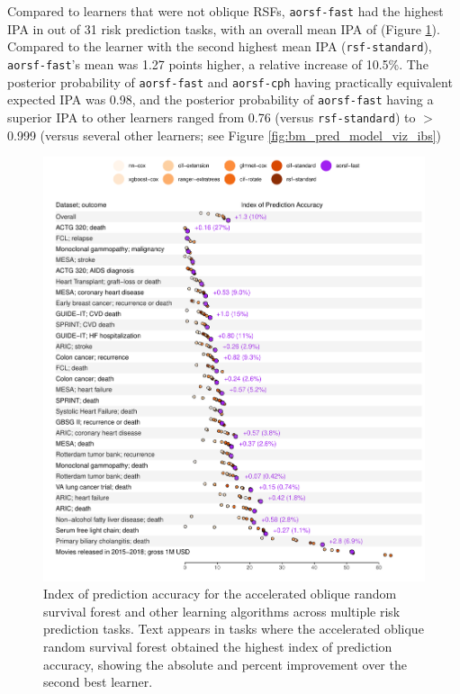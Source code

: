 \documentclass[twoside,11pt]{article}\usepackage[]{graphicx}\usepackage[]{xcolor}
\makeatletter
\def\maxwidth{ %
  \ifdim\Gin@nat@width>\linewidth
    \linewidth
  \else
    \Gin@nat@width
  \fi
}
\newenvironment{knitrout}{}{} %
\makeatother
\begin{document}
Compared to learners that were not oblique RSFs, \texttt{aorsf-fast} had the highest IPA in  out of 31 risk prediction tasks, with an overall mean IPA of  (Figure \ref{fig:bm_pred_viz_ibs}). Compared to the learner with the second highest mean IPA (\texttt{rsf-standard}), \texttt{aorsf-fast}'s mean was 1.27 points higher, a relative increase of 10.5\%. The posterior probability of \texttt{aorsf-fast} and \texttt{aorsf-cph} having practically equivalent expected IPA was 0.98, and the posterior probability of \texttt{aorsf-fast} having a superior IPA to other learners ranged from 0.76 (versus \texttt{rsf-standard}) to $>$0.999 (versus several other learners; see Figure \ref{fig:bm_pred_model_viz_ibs})

\begin{knitrout}
\color{fgcolor}\begin{figure}
\includegraphics[width=\maxwidth]{figure/bm_pred_viz_ibs-1} \caption[Index of prediction accuracy for the accelerated oblique random survival forest and other learning algorithms across multiple risk prediction tasks]{Index of prediction accuracy for the accelerated oblique random survival forest and other learning algorithms across multiple risk prediction tasks. Text appears in tasks where the accelerated oblique random survival forest obtained the highest index of prediction accuracy, showing the absolute and percent improvement over the second best learner.}\label{fig:bm_pred_viz_ibs}
\end{figure}

\end{knitrout}
\end{document}
